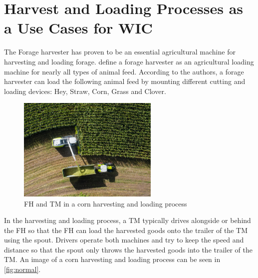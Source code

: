 \section{Harvest and Loading Processes as a Use Cases for \acf{WIC}}
The Forage harvester has proven to be an essential agricultural machine for harvesting and loading forage. \textcite{seifert_feldhacksler_1962} define a forage harvester
as an agricultural loading machine for nearly all types of animal feed. According to the authors, a forage harvester can load the following animal feed by mounting different cutting and loading devices: Hey, Straw, Corn, Grass and Clover.
\begin{figure}%
	\centering
	\includegraphics[width=0.6\textwidth]{figures/claas_harvest_side.png}
	\caption{\acf{FH} and \acf{TM} in a corn harvesting and loading process}%
	\label{fig:normal}%
\end{figure}

In the harvesting and loading process, a \ac{TM} typically drives alongside or behind the \ac{FH} so that the \ac{FH} can load the harvested goods onto the trailer of the \ac{TM} using the spout. Drivers operate both machines and try to keep the speed and distance so that the spout only throws the harvested goods into the trailer of the TM. An image of a corn harvesting and loading process can be seen in \autoref{fig:normal}.

